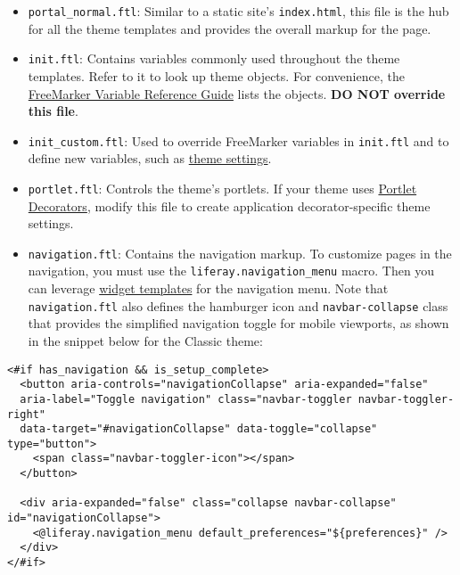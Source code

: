 \begin{itemize}
\tightlist
\item
  \texttt{portal\_normal.ftl}: Similar to a static site's
  \texttt{index.html}, this file is the hub for all the theme templates
  and provides the overall markup for the page.
\item
  \texttt{init.ftl}: Contains variables commonly used throughout the
  theme templates. Refer to it to look up theme objects. For
  convenience, the
  \href{/docs/7-2/reference/-/knowledge_base/r/freemarker-variable-reference-guide}{FreeMarker
  Variable Reference Guide} lists the objects. \textbf{DO NOT override
  this file}.
\item
  \texttt{init\_custom.ftl}: Used to override FreeMarker variables in
  \texttt{init.ftl} and to define new variables, such as
  \href{/docs/7-2/frameworks/-/knowledge_base/f/making-configurable-theme-settings}{theme
  settings}.
\item
  \texttt{portlet.ftl}: Controls the theme's portlets. If your theme
  uses
  \href{/docs/7-2/frameworks/-/knowledge_base/f/theming-portlets\#portlet-decorators}{Portlet
  Decorators}, modify this file to create application decorator-specific
  theme settings.
\item
  \texttt{navigation.ftl}: Contains the navigation markup. To customize
  pages in the navigation, you must use the
  \texttt{liferay.navigation\_menu} macro. Then you can leverage
  \href{https://github.com/liferay/liferay-portal/tree/7.2.x/modules/apps/site-navigation/site-navigation-menu-web/src/main/resources/com/liferay/site/navigation/menu/web/portlet/template/dependencies}{widget
  templates} for the navigation menu. Note that \texttt{navigation.ftl}
  also defines the hamburger icon and \texttt{navbar-collapse} class
  that provides the simplified navigation toggle for mobile viewports,
  as shown in the snippet below for the Classic theme:
\end{itemize}

\begin{verbatim}
<#if has_navigation && is_setup_complete>
  <button aria-controls="navigationCollapse" aria-expanded="false" 
  aria-label="Toggle navigation" class="navbar-toggler navbar-toggler-right" 
  data-target="#navigationCollapse" data-toggle="collapse" type="button">
    <span class="navbar-toggler-icon"></span>
  </button>

  <div aria-expanded="false" class="collapse navbar-collapse" id="navigationCollapse">
    <@liferay.navigation_menu default_preferences="${preferences}" />
  </div>
</#if>
\end{verbatim}

